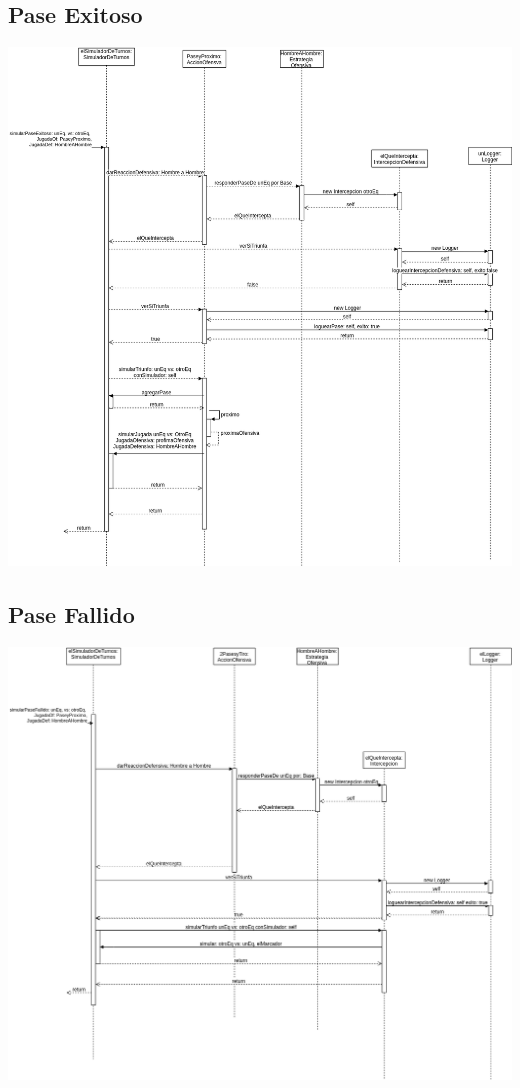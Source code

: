 \subsection{Pase Exitoso}
\includegraphics[width=\textwidth]{imgs/PaseExitoso.png}
\subsection{Pase Fallido}
\includegraphics[width=\textwidth]{imgs/PaseFallido.png}

